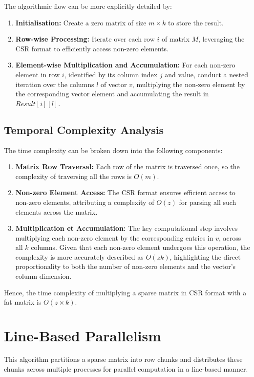 \documentclass[12pt,oneside]{book} %
\begin{document}
The algorithmic flow can be more explicitly detailed by:
\begin{enumerate}
    \item \textbf{Initialisation:} Create a zero matrix of size \( m \times k \) to store the result.
    \item \textbf{Row-wise Processing:} Iterate over each row \(i\) of matrix \(M\), leveraging the CSR format to efficiently access non-zero elements.
    \item \textbf{Element-wise Multiplication and Accumulation:} For each non-zero element in row \(i\), identified by its column index \(j\) and value, conduct a nested iteration over the columns \(l\) of vector \(v\), multiplying the non-zero element by the corresponding vector element and accumulating the result in \(Result[i][l]\).
\end{enumerate}

\subsection{Temporal Complexity Analysis}

The time complexity can be broken down into the following components:

\begin{enumerate}
    \item \textbf{Matrix Row Traversal:} Each row of the matrix is traversed once, so the complexity of traversing all the rows is \( O(m) \).
    \item \textbf{Non-zero Element Access:} The CSR format ensures efficient access to non-zero elements, attributing a complexity of \(O(z)\) for parsing all such elements across the matrix.
    \item \textbf{Multiplication et Accumulation:} The key computational step involves multiplying each non-zero element by the corresponding entries in \(v\), across all \(k\) columns. Given that each non-zero element undergoes this operation, the complexity is more accurately described as \(O(zk)\), highlighting the direct proportionality to both the number of non-zero elements and the vector's column dimension.
\end{enumerate}

Hence, the time complexity of multiplying a sparse matrix in CSR format with a
fat matrix is \( O(z \times k) \).

\newpage
\section{Line-Based Parallelism}
This algorithm partitions a sparse matrix into row chunks and distributes these
chunks across multiple processes for parallel computation in a line-based
manner.
\end{document}
